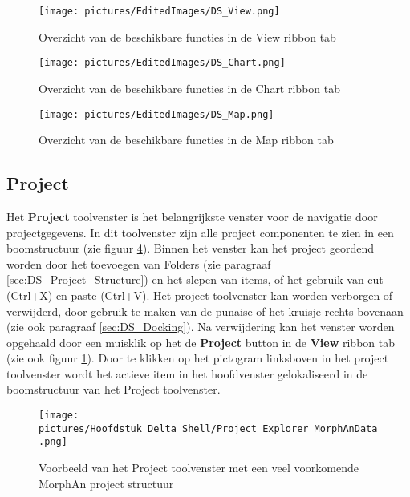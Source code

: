 \begin{figure}[H]
	\centering
		\texttt{[image: pictures/EditedImages/DS\_View.png]}
		\caption{Overzicht van de beschikbare functies in de View ribbon tab}
	\label{fig:DS_Ribbon_View}
\end{figure}

\begin{figure}[H]
	\centering
		\texttt{[image: pictures/EditedImages/DS\_Chart.png]}
		\caption{Overzicht van de beschikbare functies in de Chart ribbon tab}
	\label{fig:DS_Ribbon_Chart}
\end{figure}

\begin{figure}[H]
	\centering
		\texttt{[image: pictures/EditedImages/DS\_Map.png]}
		\caption{Overzicht van de beschikbare functies in de Map ribbon tab}
	\label{fig:DS_Ribbon_Map}
\end{figure}

\subsection{Project}
	\label{sec:DS_Project_Explorer}
Het \textbf{Project} toolvenster is het belangrijkste venster voor de navigatie door projectgegevens. In dit toolvenster zijn alle project componenten te zien in een boomstructuur (zie figuur \ref{fig:DS_Project_Explorer}). Binnen het venster kan het project geordend worden door het toevoegen van Folders (zie paragraaf \ref{sec:DS_Project_Structure}) en het slepen van items, of het gebruik van cut (Ctrl+X) en paste (Ctrl+V). Het project toolvenster kan worden verborgen of verwijderd, door gebruik te maken van de punaise of het kruisje rechts bovenaan (zie ook paragraaf \ref{sec:DS_Docking}). Na verwijdering kan het venster worden opgehaald door een muisklik op het de \textbf{Project} button in de \textbf{View} ribbon tab (zie ook figuur \ref{fig:DS_Ribbon_View}). Door te klikken op het pictogram linksboven in het project toolvenster wordt het actieve item in het hoofdvenster gelokaliseerd in de boomstructuur van het Project toolvenster.

\begin{figure}[H]
	\centering
		\texttt{[image: pictures/Hoofdstuk\_Delta\_Shell/Project\_Explorer\_MorphAnData.png]}
		\caption{Voorbeeld van het Project toolvenster met een veel voorkomende MorphAn project structuur}
	\label{fig:DS_Project_Explorer}
\end{figure}

